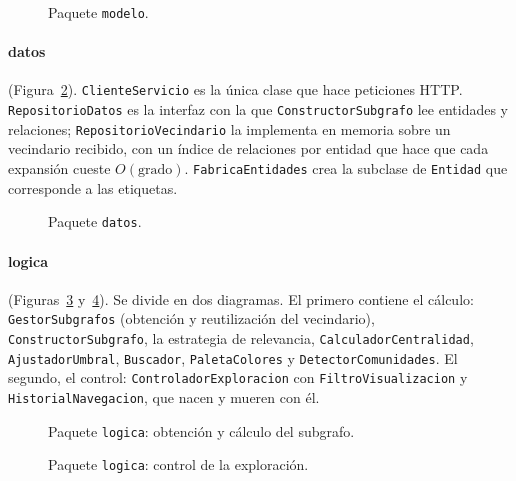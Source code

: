 \begin{figure}[htbp]
  \centering
  \caption{Paquete \texttt{modelo}.}
  \label{fig:clases-modelo}
\end{figure}

\paragraph{datos} (Figura~\ref{fig:clases-datos}). \texttt{ClienteServicio} es la única clase que hace peticiones HTTP. \texttt{RepositorioDatos} es la interfaz con la que \texttt{ConstructorSubgrafo} lee entidades y relaciones; \texttt{RepositorioVecindario} la implementa en memoria sobre un vecindario recibido, con un índice de relaciones por entidad que hace que cada expansión cueste $O(\text{grado})$. \texttt{FabricaEntidades} crea la subclase de \texttt{Entidad} que corresponde a las etiquetas.

\begin{figure}[htbp]
  \centering
  \caption{Paquete \texttt{datos}.}
  \label{fig:clases-datos}
\end{figure}

\paragraph{logica} (Figuras~\ref{fig:clases-logica-subgrafo} y~\ref{fig:clases-logica-control}). Se divide en dos diagramas. El primero contiene el cálculo: \texttt{GestorSubgrafos} (obtención y reutilización del vecindario), \texttt{ConstructorSubgrafo}, la estrategia de relevancia, \texttt{CalculadorCentralidad}, \texttt{AjustadorUmbral}, \texttt{Buscador}, \texttt{PaletaColores} y \texttt{DetectorComunidades}. El segundo, el control: \texttt{ControladorExploracion} con \texttt{FiltroVisualizacion} y \texttt{HistorialNavegacion}, que nacen y mueren con él.

\begin{figure}[htbp]
  \centering
  \caption{Paquete \texttt{logica}: obtención y cálculo del subgrafo.}
  \label{fig:clases-logica-subgrafo}
\end{figure}

\begin{figure}[htbp]
  \centering
  \caption{Paquete \texttt{logica}: control de la exploración.}
  \label{fig:clases-logica-control}
\end{figure}

